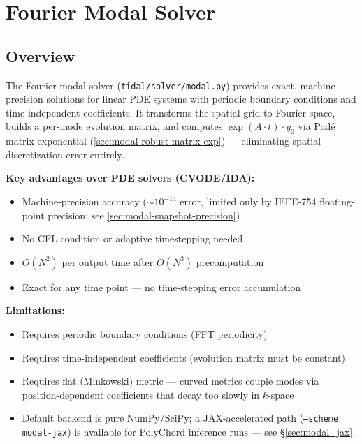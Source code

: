 
\section{Fourier Modal Solver}
\label{sec:modal-solver}

\subsection{Overview}
\label{sec:modal-overview}

The Fourier modal solver (\texttt{tidal/solver/modal.py}) provides exact, machine-precision solutions for linear PDE systems with periodic boundary conditions and time-independent coefficients. It transforms the spatial grid to Fourier space, builds a per-mode evolution matrix, and computes $\exp(A \cdot t) \cdot y_0$ via Pad\'{e} matrix-exponential (\cref{sec:modal-robust-matrix-exp}) --- eliminating spatial discretization error entirely.

\textbf{Key advantages over PDE solvers (CVODE/IDA):}
\begin{itemize}
  \item Machine-precision accuracy (${\sim}10^{-14}$ error, limited only by IEEE-754 floating-point precision; see \cref{sec:modal-snapshot-precision})
  \item No CFL condition or adaptive timestepping needed
  \item $O(N^2)$ per output time after $O(N^3)$ precomputation
  \item Exact for any time point --- no time-stepping error accumulation
\end{itemize}

\textbf{Limitations:}
\begin{itemize}
  \item Requires periodic boundary conditions (FFT periodicity)
  \item Requires time-independent coefficients (evolution matrix must be constant)
  \item Requires flat (Minkowski) metric --- curved metrics couple modes via position-dependent coefficients that decay too slowly in $k$-space
  \item Default backend is pure NumPy/SciPy; a JAX-accelerated path
    (\texttt{--scheme modal-jax}) is available for PolyChord inference runs
    --- see \S\ref{sec:modal_jax}
\end{itemize}


